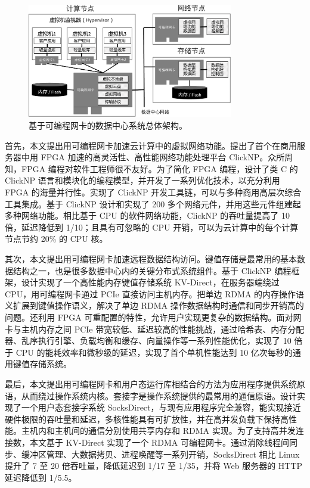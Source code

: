 \begin{figure}[htbp]
	\centering
	\includegraphics[width=0.8\textwidth]{figures/accel_arch.pdf}
	\caption{基于可编程网卡的数据中心系统总体架构。}
	\label{intro:fig:accel-arch}
\end{figure}

首先，本文提出用可编程网卡加速云计算中的虚拟网络功能。提出了首个在商用服务器中用 FPGA 加速的高灵活性、高性能网络功能处理平台 ClickNP。众所周知，FPGA 编程对软件工程师很不友好。为了简化 FPGA 编程，设计了类 C 的 ClickNP 语言和模块化的编程模型，并开发了一系列优化技术，以充分利用 FPGA 的海量并行性。实现了 ClickNP 开发工具链，可以与多种商用高层次综合工具集成。基于 ClickNP 设计和实现了 200 多个网络元件，并用这些元件组建起多种网络功能。相比基于 CPU 的软件网络功能，ClickNP 的吞吐量提高了 10 倍，延迟降低到 1/10；且具有可忽略的 CPU 开销，可以为云计算中的每个计算节点节约 20\% 的 CPU 核。

其次，本文提出用可编程网卡加速远程数据结构访问。键值存储是最常用的基本数据结构之一，也是很多数据中心内的关键分布式系统组件。基于 ClickNP 编程框架，设计实现了一个高性能内存键值存储系统 KV-Direct，在服务器端绕过 CPU，用可编程网卡通过 PCIe 直接访问主机内存。把单边 RDMA 的内存操作语义扩展到键值操作语义，解决了单边 RDMA 操作数据结构时通信和同步开销高的问题。还利用 FPGA 可重配置的特性，允许用户实现更复杂的数据结构。面对网卡与主机内存之间 PCIe 带宽较低、延迟较高的性能挑战，通过哈希表、内存分配器、乱序执行引擎、负载均衡和缓存、向量操作等一系列性能优化，实现了 10 倍于 CPU 的能耗效率和微秒级的延迟，实现了首个单机性能达到 10 亿次每秒的通用键值存储系统。

最后，本文提出用可编程网卡和用户态运行库相结合的方法为应用程序提供系统原语，从而绕过操作系统内核。套接字是操作系统提供的最常用的通信原语。设计实现了一个用户态套接字系统 SocksDirect，与现有应用程序完全兼容，能实现接近硬件极限的吞吐量和延迟，多核性能具有可扩放性，并在高并发负载下保持高性能。主机内和主机间的通信分别使用共享内存和 RDMA 实现。为了支持高并发连接数，本文基于 KV-Direct 实现了一个 RDMA 可编程网卡。通过消除线程间同步、缓冲区管理、大数据拷贝、进程唤醒等一系列开销，SocksDirect 相比 Linux 提升了 7 至 20 倍吞吐量，降低延迟到 1/17 至 1/35，并将 Web 服务器的 HTTP 延迟降低到 1/5.5。


